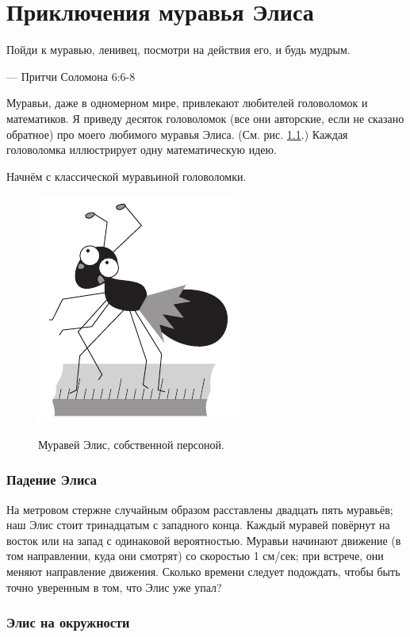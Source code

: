 \chapter{Приключения муравья Элиса}


\setlength{\epigraphwidth}{.67\textwidth}
\epigraph{Пойди к муравью, ленивец, посмотри на действия его, и будь мудрым.
}{--- Притчи Соломона 6:6-8} 

Муравьи, даже в одномерном мире, привлекают любителей головоломок и математиков.
Я приведу десяток головоломок (все они авторские, если не сказано обратное) про моего любимого муравья Элиса.
(См. рис. \ref{pic:alice1}.)
Каждая головоломка иллюстрирует одну математическую идею.

Начнём с классической муравьиной головоломки.

\begin{figure}[ht!]
\centering
\includegraphics[scale=.5]{pics/alice1}
\label{pic:alice1}
\caption{Муравей Элис, собственной персоной.}
\end{figure}

\subsection*{Падение Элиса}

На метровом стержне случайным образом расставлены двадцать пять муравьёв; наш Элис стоит тринадцатым с западного конца.
Каждый муравей повёрнут на восток или на запад с одинаковой вероятностью.
Муравьи начинают движение (в том направлении, куда они смотрят) со скоростью 1 см/сек;
при встрече, они меняют направление движения.
Сколько времени следует подождать, чтобы быть точно уверенным в том, что Элис уже упал?

\subsection*{Элис на окружности}

